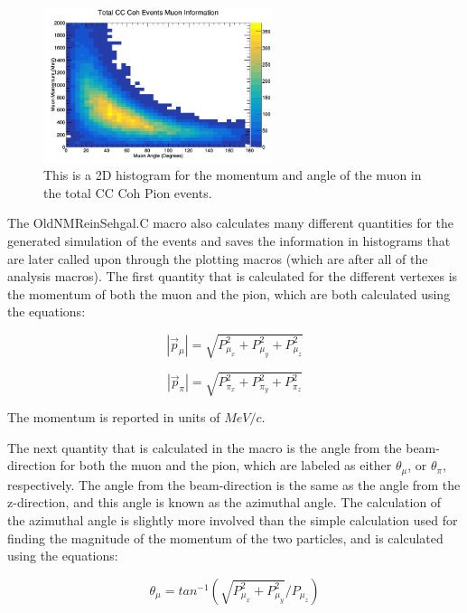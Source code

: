 \documentclass[11pt]{article}
\begin{document}
\begin{figure}[H]
\centering
\includegraphics[width=0.6\textwidth]{OldNMReinSehgalImages/9-TotalCCCohMuonInfoNMORS.png}
\caption{This is a 2D histogram for the momentum and angle of the muon in the total CC Coh Pion events.}
\end{figure}

The OldNMReinSehgal.C macro also calculates many different quantities for the generated simulation of the events and saves the information in histograms that are later called upon through the plotting macros (which are after all of the analysis macros). The first quantity that is calculated for the different vertexes is the momentum of both the muon and the pion, which are both calculated using the equations:

\begin{equation}
|\vec{p}_\mu| = \sqrt{P_{\mu_x}^2 + P_{\mu_y}^2 + P_{\mu_z}^2}
\end{equation}

\begin{equation}
|\vec{p}_\pi| = \sqrt{P_{\pi_x}^2 + P_{\pi_y}^2 + P_{\pi_z}^2}
\end{equation}

\noindent
The momentum is reported in units of $MeV/c$.

The next quantity that is calculated in the macro is the angle from the beam-direction for both the muon and the pion, which are labeled as either $\theta_\mu$, or $\theta_\pi$, respectively. The angle from the beam-direction is the same as the angle from the z-direction, and this angle is known as the azimuthal angle. The calculation of the azimuthal angle is slightly more involved than the simple calculation used for finding the magnitude of the momentum of the two particles, and is calculated using the equations:

\begin{equation}
\theta_\mu = tan^{-1}(\sqrt{P_{\mu_x}^2 + P_{\mu_y}^2}/{P_{\mu_z}})
\end{equation}
\end{document}
